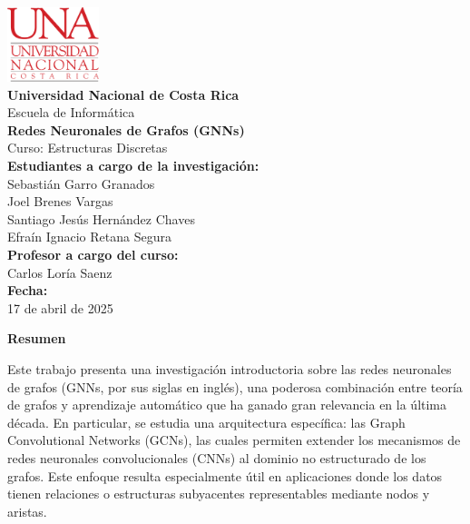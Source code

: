 \documentclass[11pt]{article} %
\begin{document}
\begin{titlepage}
    \thispagestyle{empty}
    \begin{spacing}{1.5}
    \begin{center}
        \includegraphics[width=0.2\textwidth]{Images/LogoUNA.svg.png} \\[30pt]
        {\Large \textbf{Universidad Nacional de Costa Rica}} \\[20pt] 
        {\Large Escuela de Informática} \\[20pt]
        {\Large \textbf{Redes Neuronales de Grafos (GNNs)}} \\[20pt]
        {\Large Curso: Estructuras Discretas} \\[20pt]
        {\Large \textbf{Estudiantes a cargo de la investigación:}} \\[10pt]
        {\large Sebastián Garro Granados \\ Joel Brenes Vargas \\ Santiago Jesús Hernández Chaves \\ Efraín Ignacio Retana Segura} \\[20pt]
        {\Large \textbf{Profesor a cargo del curso:}} \\[15pt]
        {\large Carlos Loría Saenz} \\[120pt]
        {\Large \textbf{Fecha:}} \\[15pt]
        {\large 17 de abril de 2025}
    \end{center}
    \end{spacing}
\end{titlepage}

\newpage
{\large \textbf{Resumen}}  
\vspace{5pt}

Este trabajo presenta una investigación introductoria sobre las redes neuronales de grafos (GNNs, por sus siglas en inglés), una poderosa combinación entre teoría de grafos y aprendizaje automático que ha ganado gran relevancia en la última década. En particular, se estudia una arquitectura específica: las Graph Convolutional Networks (GCNs), las cuales permiten extender los mecanismos de redes neuronales convolucionales (CNNs) al dominio no estructurado de los grafos. Este enfoque resulta especialmente útil en aplicaciones donde los datos tienen relaciones o estructuras subyacentes representables mediante nodos y aristas.
\end{document}
